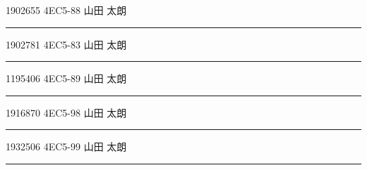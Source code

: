 \documentclass[a4paper,twocolumn,dvipdfmx]{tarticle}
\begin{document}
\hspace{1cm}1902655 4EC5-88 山田 太朗\vspace{1mm}%
\vspace{0.6cm}
\hrule\par\vspace{1mm}
\hspace{1cm}1902781 4EC5-83 山田 太朗\vspace{1mm} %
\vspace{0.6cm}
\hrule\par\vspace{1mm}
\hspace{1cm}1195406 4EC5-89 山田 太朗\vspace{1mm} %
\vspace{0.6cm}
\hrule\par\vspace{1mm}
\hspace{1cm}1916870 4EC5-98 山田 太朗\vspace{1mm} %
\vspace{0.6cm}
\hrule\par\vspace{1mm}
\hspace{1cm}1932506 4EC5-99 山田 太朗\vspace{1mm} %
\vspace{0.6cm}
\hrule
\end{document}
